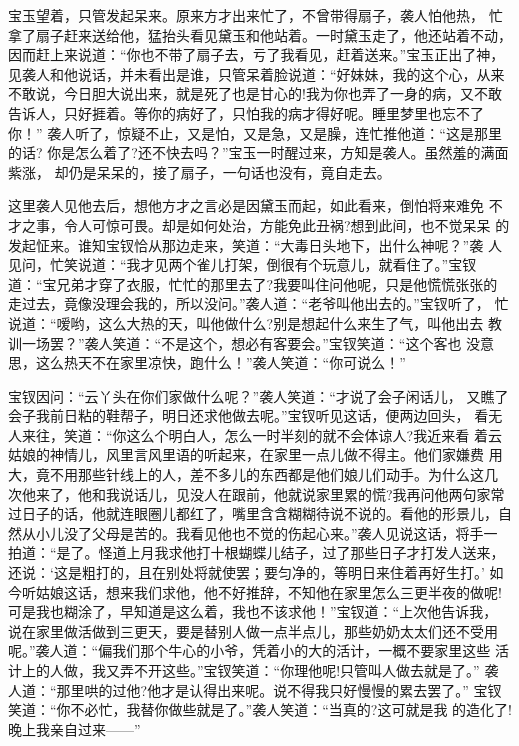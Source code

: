 宝玉望着，只管发起呆来。原来方才出来忙了，不曾带得扇子，袭人怕他热，
忙拿了扇子赶来送给他，猛抬头看见黛玉和他站着。一时黛玉走了，他还站着不动，
因而赶上来说道：“你也不带了扇子去，亏了我看见，赶着送来。”宝玉正出了神，
见袭人和他说话，并未看出是谁，只管呆着脸说道：“好妹妹，我的这个心，从来
不敢说，今日胆大说出来，就是死了也是甘心的!我为你也弄了一身的病，又不敢
告诉人，只好捱着。等你的病好了，只怕我的病才得好呢。睡里梦里也忘不了你！”
袭人听了，惊疑不止，又是怕，又是急，又是臊，连忙推他道：“这是那里的话?
你是怎么着了?还不快去吗？”宝玉一时醒过来，方知是袭人。虽然羞的满面紫涨，
却仍是呆呆的，接了扇子，一句话也没有，竟自走去。

这里袭人见他去后，想他方才之言必是因黛玉而起，如此看来，倒怕将来难免
不才之事，令人可惊可畏。却是如何处治，方能免此丑祸?想到此间，也不觉呆呆
的发起怔来。谁知宝钗恰从那边走来，笑道：“大毒日头地下，出什么神呢？”袭
人见问，忙笑说道：“我才见两个雀儿打架，倒很有个玩意儿，就看住了。”宝钗
道：“宝兄弟才穿了衣服，忙忙的那里去了?我要叫住问他呢，只是他慌慌张张的
走过去，竟像没理会我的，所以没问。”袭人道：“老爷叫他出去的。”宝钗听了，
忙说道：“嗳哟，这么大热的天，叫他做什么?别是想起什么来生了气，叫他出去
教训一场罢？”袭人笑道：“不是这个，想必有客要会。”宝钗笑道：“这个客也
没意思，这么热天不在家里凉快，跑什么！”袭人笑道：“你可说么！”

宝钗因问：“云丫头在你们家做什么呢？”袭人笑道：“才说了会子闲话儿，
又瞧了会子我前日粘的鞋帮子，明日还求他做去呢。”宝钗听见这话，便两边回头，
看无人来往，笑道：“你这么个明白人，怎么一时半刻的就不会体谅人?我近来看
着云姑娘的神情儿，风里言风里语的听起来，在家里一点儿做不得主。他们家嫌费
用大，竟不用那些针线上的人，差不多儿的东西都是他们娘儿们动手。为什么这几
次他来了，他和我说话儿，见没人在跟前，他就说家里累的慌?我再问他两句家常
过日子的话，他就连眼圈儿都红了，嘴里含含糊糊待说不说的。看他的形景儿，自
然从小儿没了父母是苦的。我看见他也不觉的伤起心来。”袭人见说这话，将手一
拍道：“是了。怪道上月我求他打十根蝴蝶儿结子，过了那些日子才打发人送来，
还说：‘这是粗打的，且在别处将就使罢；要匀净的，等明日来住着再好生打。’
如今听姑娘这话，想来我们求他，他不好推辞，不知他在家里怎么三更半夜的做呢!
可是我也糊涂了，早知道是这么着，我也不该求他！”宝钗道：“上次他告诉我，
说在家里做活做到三更天，要是替别人做一点半点儿，那些奶奶太太们还不受用
呢。”袭人道：“偏我们那个牛心的小爷，凭着小的大的活计，一概不要家里这些
活计上的人做，我又弄不开这些。”宝钗笑道：“你理他呢!只管叫人做去就是了。”
袭人道：“那里哄的过他?他才是认得出来呢。说不得我只好慢慢的累去罢了。”
宝钗笑道：“你不必忙，我替你做些就是了。”袭人笑道：“当真的?这可就是我
的造化了!晚上我亲自过来——”

